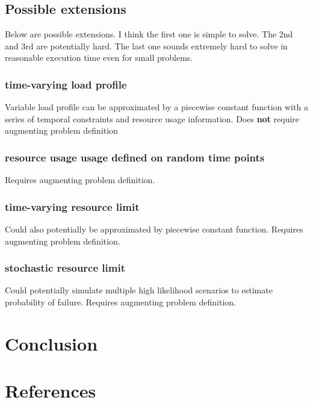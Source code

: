 \documentclass{article}
\begin{document}
\begin{multicols}{2}
\subsection{Possible extensions}
Below are possible extensions. I think the first one is simple to solve. The 2nd and 3rd are potentially hard. The last one sounds extremely hard to solve in reasonable execution time even for small problems.
\subsubsection{time-varying load profile}
Variable load profile can be approximated by a piecewise constant function with a series of temporal constraints and resource usage information. Does \textbf{not} require augmenting problem definition
\subsubsection{resource usage usage defined on random time points}
Requires augmenting problem definition.
\subsubsection{time-varying resource limit}
Could also potentially be approximated by piecewise constant function. Requires augmenting problem definition.
\subsubsection{stochastic resource limit}
Could potentially simulate multiple high likelihood scenarios to estimate probability of failure. Requires augmenting problem definition.%
\section{Conclusion}
\blindtext[5]
\section{References}


\end{multicols}
\end{document}
